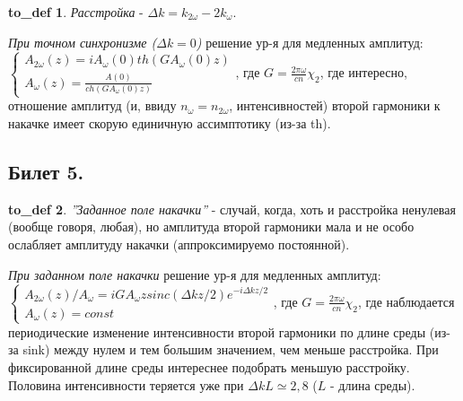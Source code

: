 \documentclass[a4paper,12pt]{article}
\theoremstyle{definition} %
\theoremstyle{definition} %
\newtheorem{to_def}{to_def}[section]
\theoremstyle{remark} %
\begin{document}
\begin{to_def}
	\textit{Расстройка} - $\Delta k = k_{2\omega}-2k_{\omega}$.
\end{to_def}

\textit{При точном синхронизме ($\Delta k = 0$)} решение ур-я для медленных амплитуд: \\$
	\begin{cases}
		A_{2\omega}(z)=iA_{\omega}(0)th(GA_{\omega}(0)z) \\
		A_{\omega}(z)=\frac{A(0)}{ch(GA_{\omega}(0)z)}
	\end{cases}$, где $G=\frac{2\pi \omega}{cn}\chi_{2}$, где интересно, отношение амплитуд (и, ввиду $n_{\omega}=n_{2\omega}$, интенсивностей) второй гармоники к накачке имеет скорую единичную ассимптотику (из-за th).

	
\subsection{Билет 5.}

\begin{to_def}
	\textit{''Заданное поле накачки''} - случай, когда, хоть и расстройка ненулевая (вообще говоря, любая), но амплитуда второй гармоники мала и не особо ослабляет амплитуду накачки (аппроксимируемо постоянной).
\end{to_def}

\textit{При заданном поле накачки} решение ур-я для медленных амплитуд: \\$
	\begin{cases}
		A_{2\omega}(z)/A_{\omega}=iGA_{\omega}z sinc(\Delta k z/2) e^{-i\Delta k z/2} \\
		A_{\omega}(z)=const
	\end{cases}$, где $G=\frac{2\pi \omega}{cn}\chi_{2}$, где наблюдается периодические изменение интенсивности второй гармоники по длине среды (из-за sink) между нулем и тем большим значением, чем меньше расстройка. При фиксированной длине среды интереснее подобрать меньшую расстройку. Половина интенсивности теряется уже при $\Delta k L \simeq 2,8$ ($L$ - длина среды).
\end{document}
